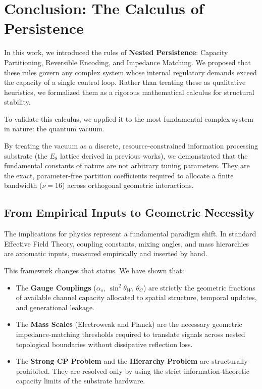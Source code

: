 \section{Conclusion: The Calculus of Persistence}

In this work, we introduced the rules of \textbf{Nested Persistence}: Capacity Partitioning, Reversible Encoding, and Impedance Matching. We proposed that these rules govern any complex system whose internal regulatory demands exceed the capacity of a single control loop. Rather than treating these as qualitative heuristics, we formalized them as a rigorous mathematical calculus for structural stability. 

To validate this calculus, we applied it to the most fundamental complex system in nature: the quantum vacuum. 

By treating the vacuum as a discrete, resource-constrained information processing substrate (the $E_8$ lattice derived in previous works), we demonstrated that the fundamental constants of nature are not arbitrary tuning parameters. They are the exact, parameter-free partition coefficients required to allocate a finite bandwidth ($\nu=16$) across orthogonal geometric interactions.

\subsection{From Empirical Inputs to Geometric Necessity}

The implications for physics represent a fundamental paradigm shift. In standard Effective Field Theory, coupling constants, mixing angles, and mass hierarchies are axiomatic inputs, measured empirically and inserted by hand. 

This framework changes that status. We have shown that:
\begin{itemize}
    \item The \textbf{Gauge Couplings} ($\alpha_s$, $\sin^2 \theta_W$, $\theta_C$) are strictly the geometric fractions of available channel capacity allocated to spatial structure, temporal updates, and generational leakage.
    \item The \textbf{Mass Scales} (Electroweak and Planck) are the necessary geometric impedance-matching thresholds required to translate signals across nested topological boundaries without dissipative reflection loss.
    \item The \textbf{Strong CP Problem} and the \textbf{Hierarchy Problem} are structurally prohibited. They are resolved only by using the strict information-theoretic capacity limits of the substrate hardware. 
\end{itemize}

